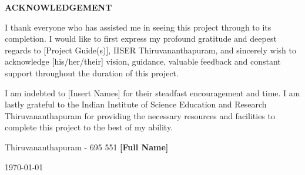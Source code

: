 \begin{center}
{\large{\bf{ACKNOWLEDGEMENT}}}
\end{center}


 I thank everyone who has assisted me in seeing this project through to its completion. I would like to first express my profound gratitude and deepest regards to [Project Guide(s)], IISER Thiruvananthapuram, and sincerely wish to acknowledge [his/her/their] vision, guidance, valuable feedback and constant support throughout the duration of this project.

I am indebted to [Insert Names] for their steadfast encouragement and time. I am lastly grateful to the Indian Institute of Science Education and Research Thiruvananthapuram for providing the necessary resources and facilities to complete this project to the best of my ability.


\vspace{4cm} %

\noindent Thiruvananthapuram - 695 551 \hfill \textbf{[Full Name]}

\noindent \today \hfill

\clearpage